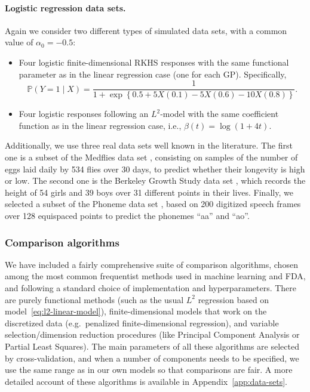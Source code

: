 \documentclass{article}
\numberwithin{equation}{section}
\theoremstyle{plain}
\theoremstyle{definition}
\begin{document}
\paragraph*{Logistic regression data sets.} Again we consider two different types of simulated data sets,  with a common value of \(\alpha_0=-0.5\):
\begin{itemize}
  \item Four logistic finite-dimensional RKHS responses with the same functional parameter as in the linear regression case (one for each GP). Specifically,
        \[
          \mathbb P(Y=1\mid X) = \frac{1}{1 + \exp\left\{0.5 +5X(0.1) - 5X(0.6) - 10X(0.8)\right\}}.
        \]
  \item Four logistic responses following an \(L^2\)-model with the same coefficient function as in the linear regression case, i.e., \(\beta(t)=\log(1+4t)\).
\end{itemize}
Additionally, we use three real data sets well known in the literature. The first one is a subset of the Medflies data set \citep{carey1998relationship}, consisting on samples of the number of eggs laid daily by 534 flies over 30 days, to predict whether their longevity is high or low. The second one is the Berkeley Growth Study data set \citep{tuddenham1954physical}, which records the height of 54 girls and 39 boys over 31 different points in their lives. Finally, we selected a subset of the Phoneme data set \citep{hastie1995penalized}, based on 200 digitized speech frames over 128 equispaced points to predict the phonemes ``aa'' and ``ao''.

\subsubsection*{Comparison algorithms}

We have included a fairly comprehensive suite of comparison algorithms, chosen among the most common frequentist methods used in machine learning and FDA, and following a standard choice of implementation and hyperparameters. There are purely functional methods (such as the usual \(L^2\) regression based on model~\eqref{eq:l2-linear-model}), finite-dimensional models that work on the discretized data (e.g.\ penalized finite-dimensional regression), and variable selection/dimension reduction procedures (like Principal Component Analysis or Partial Least Squares). The main parameters of all these algorithms are selected by cross-validation, and when a number of components needs to be specified, we use the same range as in our own models so that comparisons are fair. A more detailed account of these algorithms is available in Appendix~\ref{app:data-sets}.
\end{document}
